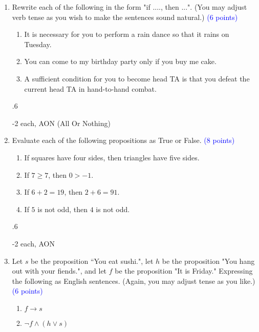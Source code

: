 \documentclass{article}
\newcommand{\pt}[1]{\textcolor{blue}{(#1 points)}}
\newenvironment{rubric}
{
\par
\begin{spacing}{.6}
\begin{itshape}
\color{red}

}
{
\end{itshape}
\end{spacing}
\par
}
\begin{document}
\begin{enumerate}

    \item Rewrite each of the following in the form "if ...., then ...".  (You may adjust verb tense as you wish to make the sentences sound natural.) \pt 6
    
    \begin{enumerate}
        \item It is necessary for you to perform a rain dance so that it rains on Tuesday.
        
        \item You can come to my birthday party only if you buy me cake.
        
        \item A sufficient condition for you to become head TA is that you defeat the current head TA in hand-to-hand combat.
    \end{enumerate}
    
    \begin{rubric}
    -2 each, AON (All Or Nothing)
    \end{rubric}
    
    \item Evaluate each of the following propositions as True or False. \pt 8
    \begin{enumerate}
        \item If squares have four sides, then triangles have five sides.
        \item If $7 \geq 7$, then $0 > -1$.
        \item If $6+2 = 19$, then $2+6=91$.
        \item If $5$ is not odd, then $4$ is not odd. 
    \end{enumerate}
    
    \begin{rubric}
    -2 each, AON
    \end{rubric}
    
    \item Let $s$ be the proposition ``You eat sushi.", let $h$ be the proposition "You hang out with your fiends.", and let $f$ be the proposition "It is Friday." Expressing the following as English sentences. (Again, you may adjust tense as you like.) \pt 6
    
    \begin{enumerate}
        \item $f \rightarrow s$
        \item $\lnot f \wedge (h \vee s)$
    \end{enumerate}
    

\end{enumerate}
\end{document}
